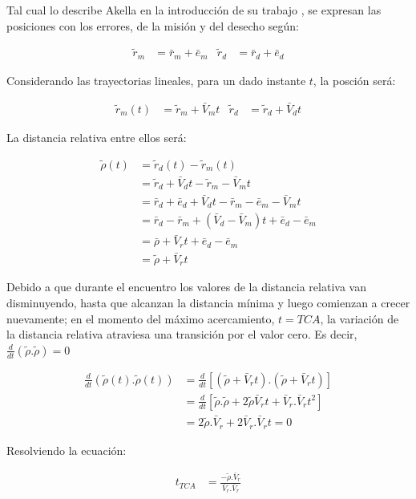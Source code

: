 Tal cual lo describe Akella en la introducci\'on de su trabajo \citep{akellaAlfriend}, se expresan las posiciones con los errores, de la misi\'on y del desecho seg\'un:

\begin{align*}
 \tilde{r}_m &= \bar{r}_m+\bar{e}_m & \tilde{r}_d &= \bar{r}_d+\bar{e}_d 
\end{align*}

Considerando las trayectorias lineales, para un dado instante $t$, la posci\'on ser\'a:

\begin{align*}
 \tilde{r}_m(t) &= \tilde{r}_m+ \bar{V}_m t& \tilde{r}_d &= \tilde{r}_d+\bar{V}_d t 
\end{align*}

La distancia relativa entre ellos ser\'a:

\begin{align*}
 \tilde{\rho}(t) &= \tilde{r}_d(t)-\tilde{r}_m(t) \\
  &=\tilde{r}_d+\bar{V}_d t-\tilde{r}_m- \bar{V}_m t\\
  &=\bar{r}_d+\bar{e}_d + \bar{V}_d t - \bar{r}_m - \bar{e}_m - \bar{V}_m t\\
  &=\bar{r}_d-\bar{r}_m + (\bar{V}_d-\bar{V}_m)t+\bar{e}_d-\bar{e}_m\\
  &=\bar{\rho} + \bar{V}_rt+\bar{e}_d-\bar{e}_m\\
  &=\tilde{\rho}+\bar{V}_rt
\end{align*}

Debido a que durante el encuentro los valores de la distancia relativa van disminuyendo, hasta que alcanzan la distancia m\'inima y luego comienzan a crecer nuevamente; en el momento del m\'aximo acercamiento, $t=TCA$, la variaci\'on de la distancia relativa atraviesa una transici\'on por el valor cero.
Es decir, $\frac{d}{dt}(\tilde{\rho}.\tilde{\rho})=0$

\begin{align*}
 \frac{d}{dt}(\tilde{\rho}(t).\tilde{\rho}(t))&= \frac{d}{dt}[(\tilde{\rho}+\bar{V}_rt).(\tilde{\rho}+\bar{V}_rt)]\\
 &=\frac{d}{dt}[\tilde{\rho}.\tilde{\rho}+2\tilde{\rho}\bar{V}_rt+\bar{V}_r.\bar{V}_rt^{2}]\\
 &=2\tilde{\rho}.\bar{V}_r+2\bar{V}_r.\bar{V}_rt = 0
\end{align*}

Resolviendo la ecuaci\'on:

\begin{align}\label{eq:ttca}
 t_{TCA}&=\frac{-\tilde{\rho}.\bar{V}_r}{\bar{V}_r.\bar{V}_r}
\end{align}

